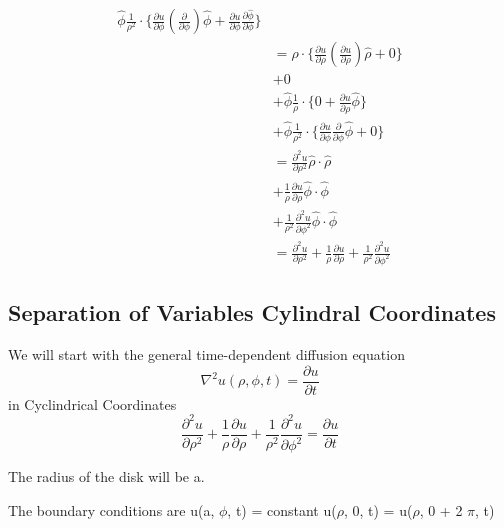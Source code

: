 \documentclass[11pt]{article}
\begin{document}
\begin{equation}
\begin{split}
\hat{\phi} \frac{1}{\rho^2} \cdot \Bigg\{\frac {\partial u}{\partial \phi} \left(\frac {\partial }{\partial \phi} \right) \hat{\phi} + \frac {\partial u}{\partial \phi} \frac {\partial \hat{\phi} }{\partial \phi} \Bigg\}
\\ & =
\hat{\rho} \cdot \Bigg\{\frac {\partial u}{\partial \rho} \left( \frac{\partial u}{\partial \rho} \right) \hat{\rho} + 0 \Bigg\} 
\\ & + 
0
\\ & + 
\hat{\phi} \frac{1}{\rho} \cdot \Bigg\{0 + \frac {\partial u}{\partial \rho} \hat{\phi}\Bigg\} 
\\ & + 
\hat{\phi} \frac{1}{\rho^2} \cdot \Bigg\{\frac {\partial u}{\partial \phi} \frac {\partial }{\partial \phi} \hat{\phi} + 0 \Bigg\}
\\ & =
\frac {\partial^2 u}{\partial \rho^2} \hat{\rho} \cdot \hat{\rho}
\\ & + 
\frac{1}{\rho} \frac {\partial u}{\partial \rho} \hat{\phi} \cdot \hat{\phi}
\\ & + 
\frac{1}{\rho^2} \frac {\partial^2 u}{\partial \phi^2} \hat{\phi} \cdot \hat{\phi}
\\ & =
\frac {\partial^2 u}{\partial \rho^2} + \frac{1}{\rho} \frac {\partial u}{\partial \rho} + 
\frac{1}{\rho^2} \frac {\partial^2 u}{\partial \phi^2} 
\end{split}
\end{equation}

    \hypertarget{separation-of-variables-cylindral-coordinates}{%
\subsection{Separation of Variables Cylindral
Coordinates}\label{separation-of-variables-cylindral-coordinates}}

    We will start with the general time-dependent diffusion equation
\begin{equation}
\nabla^2 u(\rho, \phi, t)  = \frac {\partial u}{\partial t}
\end{equation} in Cyclindrical Coordinates \begin{equation}
\frac {\partial^2 u}{\partial \rho^2} + \frac{1}{\rho} \frac {\partial u}{\partial \rho} + 
\frac{1}{\rho^2} \frac {\partial^2 u}{\partial \phi^2} = \frac {\partial u}{\partial t}
\end{equation}

The radius of the disk will be a.

The boundary conditions are u(a, \(\phi\), t) = constant u(\(\rho\), 0,
t) = u(\(\rho\), 0 + 2 \(\pi\), t)
\end{document}
